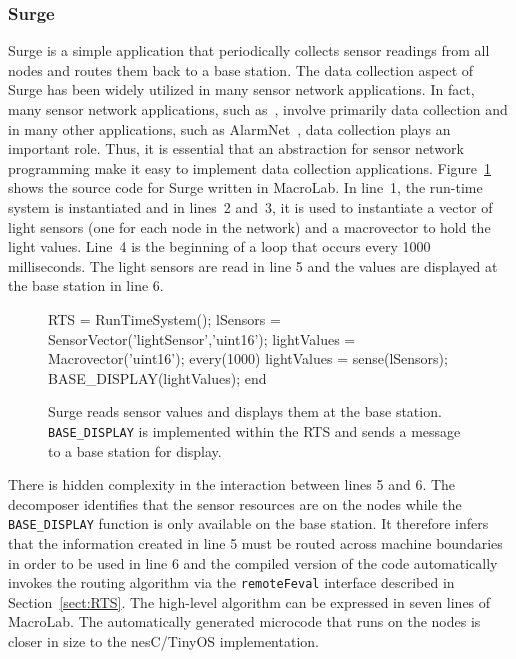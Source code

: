\subsubsection{Surge}\label{sect:surge}

Surge is a simple application that periodically collects sensor readings from
all nodes and routes them back to a base station.  The data collection aspect of
Surge has been widely utilized in many sensor network applications. In fact,
many sensor network applications, such as~\cite{Mainwaring,Juang,Selavo},
involve primarily data collection and in many other applications, such as
AlarmNet~\cite{Wood}, data collection plays an important role. Thus, it is
essential that an abstraction for sensor network programming make it easy to
implement data collection applications.  Figure~\ref{code:Surge} shows the
source code for Surge written in MacroLab.  In line~1, the run-time system is
instantiated and in lines~2 and~3, it is used to instantiate a vector of light
sensors (one for each node in the network) and a macrovector to hold the light
values.  Line~4 is the beginning of a loop that occurs every 1000 milliseconds.
The light sensors are read in line 5 and the values are displayed at the base
station in line 6.

\begin{figure}[h]
  \begin{macrolab}
RTS = RunTimeSystem();
lSensors = SensorVector('lightSensor','uint16');
lightValues = Macrovector('uint16');
every(1000)
  lightValues =  sense(lSensors);
  BASE_DISPLAY(lightValues);
end
  \end{macrolab}
  \caption[A data collection application (Surge) in MacroLab]{Surge reads sensor
  values and displays them at the base station.  {\tt BASE\_DISPLAY} is
  implemented within the RTS and sends a message to a base station for display.}
  \label{code:Surge}
\end{figure}

There is hidden complexity in the interaction between lines 5 and 6. The
decomposer identifies that the sensor resources are on the nodes while
the {\tt BASE\_DISPLAY} function is only available on the base station.  It
therefore infers that the information created in line 5 must be routed
across machine boundaries in order to be used in line 6 and the
compiled version of the code automatically invokes the routing algorithm
via the {\tt remoteFeval} interface described in Section~\ref{sect:RTS}.
The high-level algorithm can be expressed in seven lines of MacroLab. 
The automatically generated microcode that runs on the nodes is closer
in size to the nesC/TinyOS implementation. 

